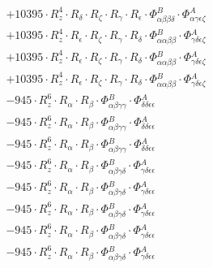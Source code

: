 \documentclass{article}
\begin{document}
\begin{subequations}
\begin{gather}
\begin{array}{c}
 \\[0.2em] 		 + 10395 \cdot R_{z}^{4} \cdot R_{\delta{}} \cdot R_{\zeta{}} \cdot R_{\gamma{}} \cdot R_{\epsilon{}} \cdot \Phi{}^{B}_{\alpha{}\beta{}\beta{}\delta{}} \cdot \Phi{}^{A}_{\alpha{}\gamma{}\epsilon{}\zeta{}} 
 \\[0.2em] 		 + 10395 \cdot R_{z}^{4} \cdot R_{\epsilon{}} \cdot R_{\zeta{}} \cdot R_{\gamma{}} \cdot R_{\delta{}} \cdot \Phi{}^{B}_{\alpha{}\alpha{}\beta{}\beta{}} \cdot \Phi{}^{A}_{\gamma{}\delta{}\epsilon{}\zeta{}} 
 \\[0.2em] 		 + 10395 \cdot R_{z}^{4} \cdot R_{\epsilon{}} \cdot R_{\zeta{}} \cdot R_{\gamma{}} \cdot R_{\delta{}} \cdot \Phi{}^{B}_{\alpha{}\alpha{}\beta{}\beta{}} \cdot \Phi{}^{A}_{\gamma{}\delta{}\epsilon{}\zeta{}} 
 \\[0.2em] 		 + 10395 \cdot R_{z}^{4} \cdot R_{\epsilon{}} \cdot R_{\zeta{}} \cdot R_{\gamma{}} \cdot R_{\delta{}} \cdot \Phi{}^{B}_{\alpha{}\alpha{}\beta{}\beta{}} \cdot \Phi{}^{A}_{\gamma{}\delta{}\epsilon{}\zeta{}} 
 \\[0.2em] 		 - 945 \cdot R_{z}^{6} \cdot R_{\alpha{}} \cdot R_{\beta{}} \cdot \Phi{}^{B}_{\alpha{}\beta{}\gamma{}\gamma{}} \cdot \Phi{}^{A}_{\delta{}\delta{}\epsilon{}\epsilon{}} 
 \\[0.2em] 		 - 945 \cdot R_{z}^{6} \cdot R_{\alpha{}} \cdot R_{\beta{}} \cdot \Phi{}^{B}_{\alpha{}\beta{}\gamma{}\gamma{}} \cdot \Phi{}^{A}_{\delta{}\delta{}\epsilon{}\epsilon{}} 
 \\[0.2em] 		 - 945 \cdot R_{z}^{6} \cdot R_{\alpha{}} \cdot R_{\beta{}} \cdot \Phi{}^{B}_{\alpha{}\beta{}\gamma{}\gamma{}} \cdot \Phi{}^{A}_{\delta{}\delta{}\epsilon{}\epsilon{}} 
 \\[0.2em] 		 - 945 \cdot R_{z}^{6} \cdot R_{\alpha{}} \cdot R_{\beta{}} \cdot \Phi{}^{B}_{\alpha{}\beta{}\gamma{}\delta{}} \cdot \Phi{}^{A}_{\gamma{}\delta{}\epsilon{}\epsilon{}} 
 \\[0.2em] 		 - 945 \cdot R_{z}^{6} \cdot R_{\alpha{}} \cdot R_{\beta{}} \cdot \Phi{}^{B}_{\alpha{}\beta{}\gamma{}\delta{}} \cdot \Phi{}^{A}_{\gamma{}\delta{}\epsilon{}\epsilon{}} 
 \\[0.2em] 		 - 945 \cdot R_{z}^{6} \cdot R_{\alpha{}} \cdot R_{\beta{}} \cdot \Phi{}^{B}_{\alpha{}\beta{}\gamma{}\delta{}} \cdot \Phi{}^{A}_{\gamma{}\delta{}\epsilon{}\epsilon{}} 
 \\[0.2em] 		 - 945 \cdot R_{z}^{6} \cdot R_{\alpha{}} \cdot R_{\beta{}} \cdot \Phi{}^{B}_{\alpha{}\beta{}\gamma{}\delta{}} \cdot \Phi{}^{A}_{\gamma{}\delta{}\epsilon{}\epsilon{}} 
 \\[0.2em] 		 - 945 \cdot R_{z}^{6} \cdot R_{\alpha{}} \cdot R_{\beta{}} \cdot \Phi{}^{B}_{\alpha{}\beta{}\gamma{}\delta{}} \cdot \Phi{}^{A}_{\gamma{}\delta{}\epsilon{}\epsilon{}} 

\end{array}
\end{gather}
\end{subequations}
\end{document}
